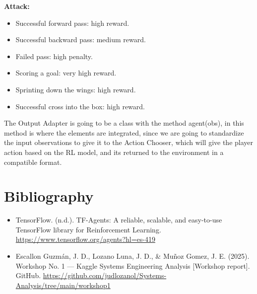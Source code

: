 \documentclass{article}
\begin{document}
\textbf{Attack:}
\begin{itemize}
    \item Successful forward pass: high reward.
    \item Successful backward pass: medium reward.
    \item Failed pass: high penalty.
    \item Scoring a goal: very high reward.
    \item Sprinting down the wings: high reward.
    \item Successful cross into the box: high reward.
\end{itemize}

The Output Adapter is going to be a class with the method agent(obs), in this method is where the elements are integrated, since we are going to standardize the input observations to give it to the Action Chooser, which will give the player action based on the RL model, and its returned to the environment in a compatible format.

\section*{Bibliography}
\begin{itemize}
    \item TensorFlow. (n.d.). TF-Agents: A reliable, scalable, and easy-to-use TensorFlow library for Reinforcement Learning. \url{https://www.tensorflow.org/agents?hl=es-419}
    \item Escallon Guzmán, J. D., Lozano Luna, J. D., \& Muñoz Gomez, J. E. (2025). Workshop No. 1 — Kaggle Systems Engineering Analysis [Workshop report]. GitHub. \url{https://github.com/judlozanol/Systems-Analysis/tree/main/workshop1}
\end{itemize}
\end{document}
